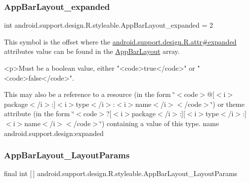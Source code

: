 \subsubsection{\texorpdfstring{App\+Bar\+Layout\+\_\+expanded}{AppBarLayout\_expanded}}
{\footnotesize\ttfamily int android.\+support.\+design.\+R.\+styleable.\+App\+Bar\+Layout\+\_\+expanded = 2\hspace{0.3cm}{\ttfamily [static]}}

This symbol is the offset where the \hyperlink{classandroid_1_1support_1_1design_1_1R_1_1attr_a3f3c11279bf1f89eabce9386b4cc52e7}{android.\+support.\+design.\+R.\+attr\#expanded} attribute\textquotesingle{}s value can be found in the \hyperlink{classandroid_1_1support_1_1design_1_1R_1_1styleable_ad4af8881949a584d986f4bfadb3e8482}{App\+Bar\+Layout} array.

\begin{DoxyVerb}      <p>Must be a boolean value, either "<code>true</code>" or "<code>false</code>".
\end{DoxyVerb}
 

This may also be a reference to a resource (in the form \char`\"{}$<$code$>$@\mbox{[}$<$i$>$package$<$/i$>$\+:\mbox{]}$<$i$>$type$<$/i$>$\+:$<$i$>$name$<$/i$>$$<$/code$>$\char`\"{}) or theme attribute (in the form \char`\"{}$<$code$>$?\mbox{[}$<$i$>$package$<$/i$>$\+:\mbox{]}\mbox{[}$<$i$>$type$<$/i$>$\+:\mbox{]}$<$i$>$name$<$/i$>$$<$/code$>$\char`\"{}) containing a value of this type.  name android.\+support.\+design\+:expanded \mbox{\label{classandroid_1_1support_1_1design_1_1R_1_1styleable_af35cb615b571fb6d447bc930baeae71d}} 
\subsubsection{\texorpdfstring{App\+Bar\+Layout\+\_\+\+Layout\+Params}{AppBarLayout\_LayoutParams}}
{\footnotesize\ttfamily final int \mbox{[}$\,$\mbox{]} android.\+support.\+design.\+R.\+styleable.\+App\+Bar\+Layout\+\_\+\+Layout\+Params\hspace{0.3cm}{\ttfamily [static]}}

